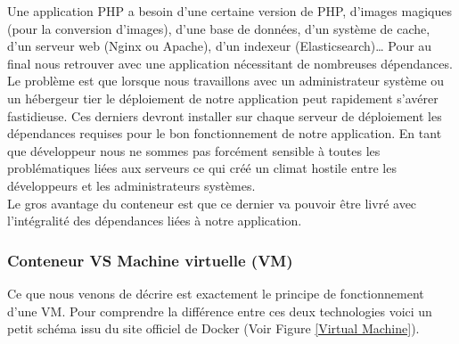 \documentclass{report}
\begin{document}
        Une application PHP a besoin d’une certaine version de PHP, d’images magiques (pour la conversion d’images), d’une base de données, d’un système de cache, d’un serveur web (Nginx ou Apache), d’un indexeur (Elasticsearch)… Pour au final nous retrouver avec une application nécessitant de nombreuses dépendances.\\

        Le problème est que lorsque nous travaillons avec un administrateur système ou un hébergeur tier le déploiement de notre application peut rapidement s’avérer fastidieuse. Ces derniers devront installer sur chaque serveur de déploiement les dépendances requises pour le bon fonctionnement de notre application. En tant que développeur nous ne sommes pas forcément sensible à toutes les problématiques liées aux serveurs ce qui créé un climat hostile entre les développeurs et les administrateurs systèmes.\\

        Le gros avantage du conteneur est que ce dernier va pouvoir être livré avec l’intégralité des dépendances liées à notre application.

        \subsubsection{Conteneur VS Machine virtuelle (VM)}
        Ce que nous venons de décrire est exactement le principe de fonctionnement d’une VM. Pour comprendre la différence entre ces deux technologies voici un petit schéma issu du site officiel de Docker (Voir Figure \ref{Virtual Machine}).\\
\end{document}
